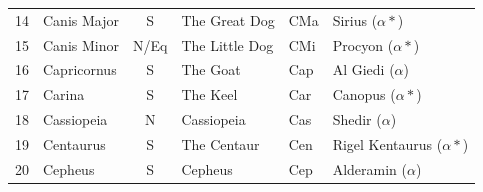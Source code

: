 \documentclass[a4paper,12pt]{extarticle}
\begin{document}
\begin{table}[H]
\begin{tabular}{llclll}
14                                                                              & Canis Major                                   & S                                        & The Great Dog                                   & CMa                                                                              & Sirius  ($\alpha \ast$)                        \\
15                                                                              & Canis Minor                                   & N/Eq                                     & The Little Dog                                  & CMi                                                                              & Procyon ($\alpha \ast$)                        \\
16                                                                              & Capricornus                                   & S                                        & The Goat                                        & Cap                                                                              & Al Giedi ($\alpha$)                            \\
17                                                                              & Carina                                        & S                                        & The Keel                                        & Car                                                                              & Canopus ($\alpha\ast$)                         \\
18                                                                              & Cassiopeia                                    & N                                        & Cassiopeia                                      & Cas                                                                              & Shedir ($\alpha$)                              \\
19                                                                              & Centaurus                                     & S                                        & The Centaur                                     & Cen                                                                              & Rigel Kentaurus  ($\alpha \ast$)               \\
20                                                                              & Cepheus                                       & S                                        & Cepheus                                         & Cep                                                                              & Alderamin  ($\alpha$)                          \\

\end{tabular}
\end{table}
\end{document}
